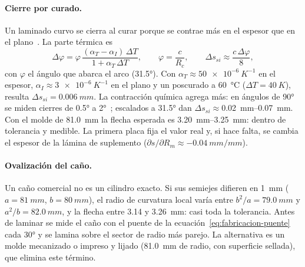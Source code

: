 \paragraph{Cierre por curado.} Un laminado curvo se cierra al curar porque se contrae más
en el espesor que en el plano~\cite{fabricacion-albert2002}. La parte térmica es
\begin{equation}
  \Delta\varphi = \varphi\,\frac{(\alpha_T-\alpha_I)\,\Delta T}{1+\alpha_T\,\Delta T},
  \qquad \varphi=\frac{c}{R_c},\qquad \Delta s_{si}\approx\frac{c\,\Delta\varphi}{8},
  \label{eq:fabricacion-springin}
\end{equation}
con $\varphi$ el ángulo que abarca el arco (\ang{31.5}). Con $\alpha_T\approx\SI{50e-6}{K^{-1}}$
en el espesor, $\alpha_I\approx\SI{3e-6}{K^{-1}}$ en el plano y un poscurado a
\SI{60}{\celsius} ($\Delta T=\SI{40}{K}$), resulta $\Delta s_{si}=\SI{0.006}{mm}$. La
contracción química agrega más: en ángulos de \ang{90} se miden cierres de
\ang{0.5} a \ang{2}~\cite{fabricacion-albert2002}; escalados a \ang{31.5} dan
$\Delta s_{si}\approx$\SIrange{0.02}{0.07}{mm}. Con el molde de \SI{81.0}{mm} la flecha
esperada es \SIrange{3.20}{3.25}{mm}: dentro de tolerancia y medible. La primera placa
fija el valor real y, si hace falta, se cambia el espesor de la lámina de suplemento
($\partial s/\partial R_m\approx\SI{-0.04}{mm/mm}$).

\paragraph{Ovalización del caño.} Un caño comercial no es un cilindro exacto. Si sus
semiejes difieren en \SI{1}{mm} ($a=\SI{81}{mm}$, $b=\SI{80}{mm}$), el radio de curvatura
local varía entre $b^2/a=\SI{79.0}{mm}$ y $a^2/b=\SI{82.0}{mm}$, y la flecha entre
\SI{3.14}{} y \SI{3.26}{mm}: casi toda la tolerancia. Antes de laminar se mide el caño con
el puente de la ecuación~\eqref{eq:fabricacion-puente} cada \ang{30} y se lamina sobre el
sector de radio más parejo. La alternativa es un molde mecanizado o impreso y lijado
(\SI{81.0}{mm} de radio, con superficie sellada), que elimina este término.

